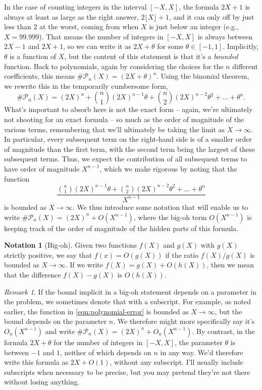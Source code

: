 \documentclass[12pt]{amsart}
\theoremstyle{definition} \newtheorem*{notation}{Notation}
\theoremstyle{remark} \newtheorem*{remark}{Remark}
\numberwithin{equation}{section}
\numberwithin{theorem}{section}
\begin{document}
	In the case of counting integers in the interval $[-X,X]$, the formula $2X+1$ is always at least as large as the right answer, $2\lfloor X\rfloor +1$, and it can only off by just less than $2$ at the worst, coming from when $X$ is just below an integer (e.g., $X = 99.999$).  That means the number of integers in $[-X,X]$ is always between $2X-1$ and $2X+1$, so we can write it as $2X+\theta$ for some $\theta \in [-1,1]$.  Implicitly, $\theta$ is a function of $X$, but the content of this statement is that it's a \emph{bounded} function.  Back to polynomials, again by considering the choices for the $n$ different coefficients, this means $\#\mathcal{P}_n(X) = (2X+\theta)^n$.  Using the binomial theorem, we rewrite this in the temporarily cumbersome form,
		\[
			\#\mathcal{P}_n(X)
				= (2X)^n + \binom{n}{1} (2X)^{n-1} \theta + \binom{n}{2} (2X)^{n-2} \theta^2 + \dots + \theta^n.
		\]
	What's important to absorb here is not the exact form -- again, we're ultimately not shooting for an exact formula -- so much as the order of magnitude of the various terms, remembering that we'll ultimately be taking the limit as $X \to \infty$.  In particular, every subsequent term on the right-hand side is of a smaller order of magnitude than the first term, with the second term being the largest of these subsequent terms.  Thus, we expect the contribution of all subsequent terms to have order of magnitude $X^{n-1}$, which we make rigorous by noting that the function
		\begin{equation}\label{eqn:polynomial-error}
			\frac{\binom{n}{1} (2X)^{n-1} \theta + \binom{n}{2} (2X)^{n-2} \theta^2 + \dots + \theta^n}{X^{n-1}}
		\end{equation}
	is bounded as $X \to \infty$.  We thus introduce some notation that will enable us to write $\#\mathcal{P}_n(X) = (2X)^n + O(X^{n-1})$, where the big-oh term $O(X^{n-1})$ is keeping track of the order of magnitude of the hidden parts of this formula.
	
	\begin{notation}[Big-oh]
		Given two functions $f(X)$ and $g(X)$ with $g(X)$ strictly positive, we say that $f(x) = O(g(X))$ if the ratio $f(X) / g(X)$ is bounded as $X \to \infty$.  If we write $f(X) = g(X) + O(h(X))$, then we mean that the difference $f(X)-g(X)$ is $O(h(X))$.  
	\end{notation}
	
	\begin{remark}
		If the bound implicit in a big-oh statement depends on a parameter in the problem, we sometimes denote that with a subscript.  For example, as noted earlier, the function in \eqref{eqn:polynomial-error} is bounded as $X\to \infty$, but the bound depends on the parameter $n$.  We therefore might more specifically say it's $O_n(X^{n-1})$ and write $\#\mathcal{P}_n(X) = (2X)^n + O_n(X^{n-1})$.  By contrast, in the formula $2X + \theta$ for the number of integers in $[-X,X]$, the parameter $\theta$ is between $-1$ and $1$, neither of which depends on $n$ in any way.  We'd therefore write this formula as $2X + O(1)$, without any subscript.  I'll usually include subscripts when necessary to be precise, but you may pretend they're not there without losing anything.
	\end{remark}
	
\end{document}
